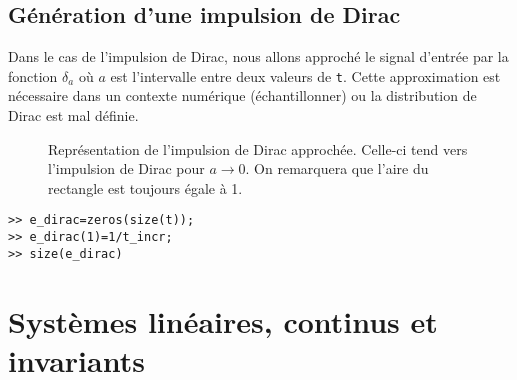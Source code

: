 \subsection{Génération d'une impulsion de Dirac}
Dans le cas de l'impulsion de Dirac, nous allons approché le signal d'entrée par 
la fonction $\delta_a$ où $a$ est l'intervalle entre deux valeurs de \texttt{t}. 
Cette approximation est nécessaire dans un contexte numérique
(échantillonner) ou la distribution de Dirac est mal définie. 
\begin{figure}[!h]
    \centering
    
    \caption{Représentation de l'impulsion de Dirac approchée. 
             Celle-ci tend vers l'impulsion de Dirac pour $a\to0$. 
             On remarquera que l'aire du rectangle est toujours égale à 1.
             \label{fig-dirac2}}
\end{figure}
\begin{verbatim}
>> e_dirac=zeros(size(t));
>> e_dirac(1)=1/t_incr;
>> size(e_dirac)
\end{verbatim}
\section{Systèmes linéaires, continus et invariants}
